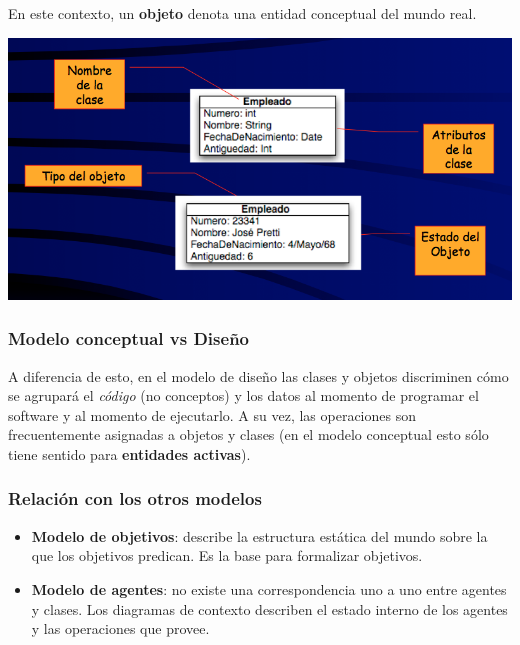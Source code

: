 \documentclass[]{article}
\begin{document}
En este contexto, un \textbf{objeto} denota una entidad conceptual del mundo real.

\begin{center}
	\includegraphics[scale=0.45]{DiagObjetos.png}
\end{center}


\subsubsection{Modelo conceptual vs Diseño}
A diferencia de esto, en el modelo de diseño las clases y objetos discriminen cómo se agrupará el \emph{código} (no conceptos) y los datos al momento de programar el software y al momento de ejecutarlo. A su vez, las operaciones son frecuentemente asignadas a objetos y clases (en el modelo conceptual esto sólo tiene sentido para \textbf{entidades activas}).

\subsubsection{Relación con los otros modelos}
\begin{itemize}
	\item \textbf{Modelo de objetivos}: describe la estructura estática del mundo sobre la que los objetivos predican. Es la base para formalizar objetivos.
	\item \textbf{Modelo de agentes}: no existe una correspondencia uno a uno entre agentes y clases. Los diagramas de contexto describen el estado interno de los agentes y las operaciones que provee.
\end{itemize}
\end{document}
